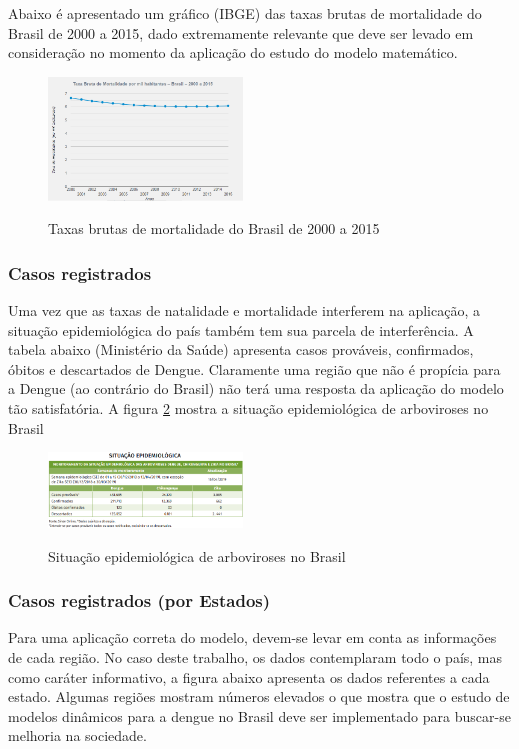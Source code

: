\documentclass[conference]{IEEEtran}
\begin{document}
Abaixo é apresentado um gráfico (IBGE) das taxas brutas de mortalidade do Brasil de 2000 a 2015, dado extremamente relevante que deve ser levado em consideração no momento da aplicação do estudo do modelo matemático.

\begin{figure}[!ht]
  \caption{Taxas brutas de mortalidade do Brasil de 2000 a 2015\cite{ibge-mortalidade}}
  \includegraphics[width=0.46\textwidth]{taxamorte.png}
  \label{fig:taxamorte}
\end{figure}

\subsubsection{Casos registrados}

Uma vez que as taxas de natalidade e mortalidade interferem na aplicação, a situação epidemiológica do país também tem sua parcela de interferência. A tabela abaixo (Ministério da Saúde) apresenta casos prováveis, confirmados, óbitos e descartados de Dengue.
Claramente uma região que não é propícia para a Dengue (ao contrário do Brasil) não terá uma resposta da aplicação do modelo tão satisfatória. A figura \ref{fig:arboviroses} mostra a situação epidemiológica de arboviroses no Brasil

\begin{figure}[!ht]
  \caption{Situação epidemiológica de arboviroses no Brasil\cite{svs}}
  \includegraphics[width=0.46\textwidth]{arboviroses.png}
  \label{fig:arboviroses}
\end{figure}

\subsubsection{Casos registrados (por Estados)}
Para uma aplicação correta do modelo, devem-se levar em conta as informações de cada região. No caso deste trabalho, os dados contemplaram todo o país, mas como caráter informativo, a figura abaixo apresenta os dados referentes a cada estado. Algumas regiões mostram números elevados o que mostra que o estudo de modelos dinâmicos para a dengue no Brasil deve ser implementado para buscar-se melhoria na sociedade.
\end{document}
